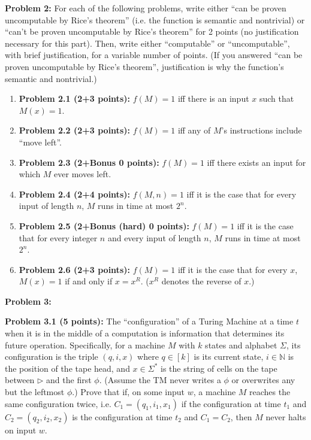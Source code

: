 \documentclass[11pt]{article}
\begin{document}
\textbf{Problem 2:} For each of the following problems, write either ``can be proven uncomputable by Rice's theorem'' (i.e. the function is semantic and nontrivial) or ``can't be proven uncomputable by Rice's theorem'' for 2 points (no justification necessary for this part). Then, write either ``computable'' or ``uncomputable'', with brief justification, for a variable number of points. (If you answered ``can be proven uncomputable by Rice's theorem'', justification is why the function's semantic and nontrivial.)

\begin{enumerate}
	\item[] \textbf{Problem 2.1 (2+3 points):}  $f(M)=1$ iff there is an input $x$ such that $M(x) = 1$.
	\item[] \textbf{Problem 2.2 (2+3 points):} $f(M) = 1$ iff any of $M$'s instructions include ``move left''.
	\item[] \textbf{Problem 2.3 (2+Bonus 0 points):} $f(M) = 1$ iff there exists an input for which $M$ ever moves left.
	\item[] \textbf{Problem 2.4 (2+4 points):}  $f(M,n) = 1$ iff it is the case that for every input of length $n$, $M$ runs in time at most $2^n$.
	\item[] \textbf{Problem 2.5 (2+Bonus (hard) 0 points):}  $f(M) = 1$ iff it is the case that for every integer $n$ and every input of length $n$, $M$ runs in time at most $2^n$.
	\item[] \textbf{Problem 2.6 (2+3 points):}  $f(M) = 1$ iff it is the case that for every $x$, $M(x) = 1$ if and only if $x = x^R$. ($x^R$ denotes the reverse of $x$.)
\end{enumerate}

\pagebreak


\textbf{Problem 3:}

\textbf{Problem 3.1 (5 points):} The ``configuration'' of a Turing Machine at a time $t$ when it is in the middle of a computation is information that determines its future operation. Specifically, for a machine $M$ with $k$ states and alphabet $\Sigma$, its configuration is the triple $(q,i,x)$ where $q \in [k]$ is its current state,  $i \in \mathbb{N}$ is the position of the tape head, and $x \in \Sigma^*$ is the string of cells on the tape between $\triangleright$ and the first $\phi$. (Assume the TM never writes a $\phi$ or overwrites any but the leftmost $\phi$.) Prove that if, on some input $w$, a machine $M$ reaches the same configuration twice, i.e. $C_1 = (q_1,i_1,x_1)$ if the configuration at time $t_1$ and $C_2 = (q_2,i_2,x_2)$ is the configuration at time $t_2$ and $C_1 = C_2$, then $M$ never halts on input $w$.
\end{document}

